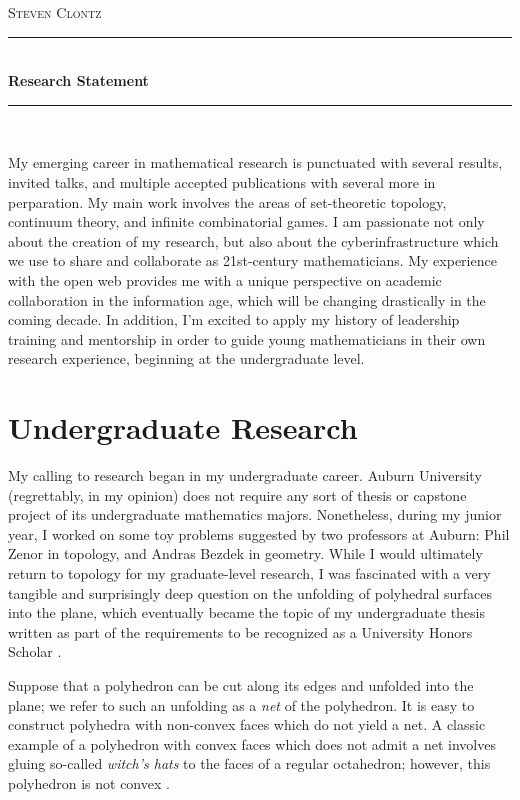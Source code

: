 \documentclass[11pt]{amsart}
\theoremstyle{plain}
\newcommand{\HRule}{\rule{\linewidth}{0.5mm}}
\newcommand{\<}{\langle}
\renewcommand{\>}{\rangle}
\newcommand{\term}{\textit}
\begin{document}
\begin{center}

\textsc{\huge Steven Clontz}

\HRule \\[0.1cm]
{ \huge \bfseries Research Statement \\[0.4cm] }

\HRule \\[1.5cm]

\end{center}


My emerging career in mathematical research is punctuated with several
results, invited talks, and multiple accepted publications with several
more in perparation. My main work involves the areas of set-theoretic topology,
continuum theory, and infinite combinatorial games. I am passionate not
only about the creation of my research, but
also about the cyberinfrastructure which we use to share and collaborate
as 21st-century mathematicians. My
experience with the open web provides me with a unique perspective on academic
collaboration in the information age, which will be changing drastically
in the coming decade. In addition, I'm excited to apply my history of
leadership training and mentorship in order to guide young mathematicians
in their own research experience, beginning at the undergraduate level.


\section*{Undergraduate Research}

My calling to research began in my undergraduate career. Auburn University
(regrettably, in my opinion) does not require any sort of thesis or capstone
project of its undergraduate mathematics majors. Nonetheless, during my junior
year, I worked on some toy problems suggested by two professors at Auburn:
Phil Zenor in topology, and Andras Bezdek in geometry. While I would ultimately
return to topology for my graduate-level research, I was fascinated with a
very tangible and surprisingly deep question on the unfolding of polyhedral
surfaces into the plane, which eventually became the topic of my undergraduate
thesis written as part of the requirements to be recognized as a University
Honors Scholar \cite{UNDERGRAD}.

Suppose that a polyhedron can be cut along its edges and unfolded into
the plane; we refer to such an unfolding as a \term{net} of the polyhedron.
It is easy to construct polyhedra with non-convex faces which do not
yield a net. A classic example of a polyhedron with convex faces which does
not admit a net involves gluing so-called \term{witch's hats} to the faces
of a regular octahedron; however, this polyhedron is not convex
\cite{UNUNFOLDABLE}.
\end{document}
